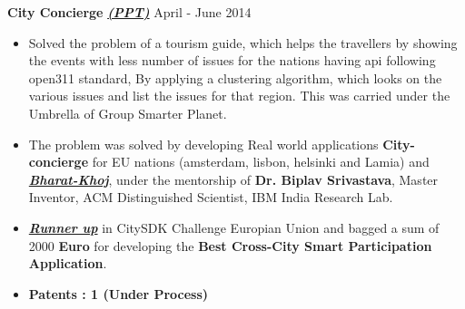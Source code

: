 \documentclass[margin,line]{res}
\begin{document}
\begin{resume}
{\bf City Concierge} 
\href{https://drive.google.com/file/d/0B3v1C2BWVcCRRm1VQXVOZkI4ZE0/view?usp=sharing}{\em {\bf (PPT)}} \hfill {April - June 2014}
\begin{itemize} %
  \setlength{\itemsep}{0.01pt}
  \setlength{\parskip}{0pt}
  \setlength{\parsep}{0pt}
  \item Solved the problem of a tourism guide, which helps the travellers by showing the events with less number of issues for the nations having api following open311 standard, By applying a clustering algorithm, which looks on the various issues and list the issues for that region. This was carried under the Umbrella of Group Smarter Planet.
  \item The problem was solved by developing  Real world applications {\bf City-concierge} for EU nations (amsterdam, lisbon, helsinki and Lamia) and \href{http://bharat-khoj-starter.mybluemix.net/}{\em {\bf Bharat-Khoj}}, under the mentorship of {\bf Dr. Biplav Srivastava}, Master Inventor, ACM Distinguished Scientist, IBM India Research Lab.
  \item  \href{http://dev.hel.fi/node/191}{\em {\bf Runner up}} in CitySDK Challenge Europian Union and bagged a sum of 2000 {\bf Euro} for developing the {\bf Best Cross-City Smart Participation Application}.
  \item {\bf Patents : 1 (Under Process)}
\end{itemize}
\vspace{0.8 mm}


\end{resume}
\end{document}
